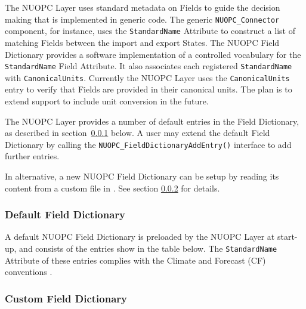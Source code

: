 %

\label{field_dictionary}

The NUOPC Layer uses standard metadata on Fields to guide the decision making that is implemented in generic code. The generic {\tt NUOPC\_Connector} component, for instance, uses the {\tt StandardName} Attribute to construct a list of matching Fields between the import and export States. The NUOPC Field Dictionary provides a software implementation of a controlled vocabulary for the {\tt StandardName} Field Attribute. It also associates each registered {\tt StandardName} with {\tt CanonicalUnits}. Currently the NUOPC Layer uses the {\tt CanonicalUnits} entry to verify that Fields are provided in their canonical units. The plan is to extend support to include unit conversion in the future.

The NUOPC Layer provides a number of default entries in the Field Dictionary, as described in section~\ref{fd:default} below. A user may extend the default Field Dictionary by calling the {\tt  NUOPC\_FieldDictionaryAddEntry()} interface to add further entries.

In alternative, a new NUOPC Field Dictionary can be setup by reading its content from a custom file in . See section \ref{fd:custom} for details.


\subsubsection{Default Field Dictionary}
\label{fd:default}

A default NUOPC Field Dictionary is preloaded by the NUOPC Layer at start-up, and consists of the entries show in the table below.
The {\tt StandardName} Attribute of these entries complies with the Climate and Forecast (CF) conventions .




\subsubsection{Custom Field Dictionary}
\label{fd:custom}

